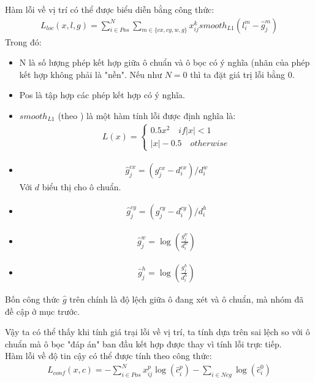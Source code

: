 \documentclass[a4paper,12pt]{article}
\begin{document}
	Hàm lỗi về vị trí có thể được biểu diễn bằng công thức:
	\begin{align}
	L_{loc}(x,l,g) = \sum^N_{i \in Pos} \sum_{m \in \{ cx, cy, w, g \}} x^k_{ij} smooth_{L1} (l^m_i - \hat{g}^m_j)
	\end{align}
	Trong đó:
	\begin{itemize}
		\item N là số lượng phép kết hợp giữa ô chuẩn và ô bọc có ý nghĩa (nhãn của phép kết hợp không phải là "nền". Nếu như $N = 0$ thì ta đặt giá trị lỗi bằng 0.
		\item Pos là tập hợp các phép kết hợp có ý nghĩa.
		\item $smooth_{L1}$ (theo \cite{girshick2015fast}) là một hàm tính lỗi được định nghĩa là:
		\begin{align}
		L(x) = \begin{cases} 0.5x^2 \quad if |x| < 1 \\ |x| - 0.5 \quad otherwise \end{cases}
		\end{align}
		\item \begin{align}\hat{g}_j^{cx} = (g_j^{cx} - d_i^{cx}) / d^w_i\end{align}Với $d$ biểu thị cho ô chuẩn.
		\item \begin{align}\hat{g}_j^{cy} = (g_j^{cy} - d_i^{cy}) / d^h_i\end{align}
		\item \begin{align}\hat{g}^w_j = \log \left( \frac{g_j^w}{d_i^w} \right)\end{align}
		\item \begin{align}\hat{g}^h_j = \log \left( \frac{g_j^h}{d_i^h} \right)\end{align}
	\end{itemize}
	
	Bốn công thức $\hat{g}$ trên chính là độ lệch giữa ô đang xét và ô chuẩn, mà nhóm đã đề cập ở mục trước.
	
	Vậy ta có thể thấy khi tính giá trại lỗi về vị trí, ta tính dựa trên sai lệch so với ô chuẩn mà ô bọc "đáp án" ban đầu kết hợp được thay vì tính lỗi trực tiếp.\\
	
	Hàm lỗi về độ tin cậy có thể được tính theo công thức:
	\begin{align}
	L_{conf}(x, c) = - \sum^N_{i \in Pos} x^p_{ij} \log (\hat{c}^p_i) - \sum_{i \in Neg} \log (\hat{c}^0_i)
	\end{align}
	
\end{document}
